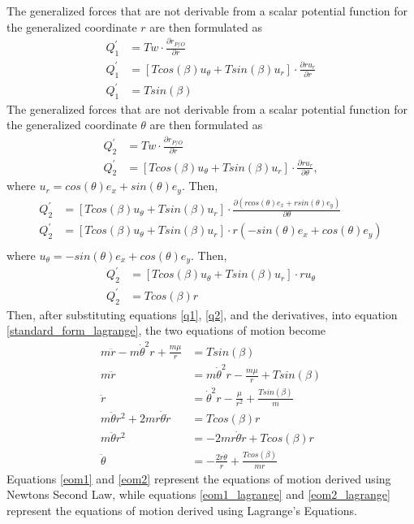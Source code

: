 \documentclass[]{article}
\begin{document}
The generalized forces that are not derivable from a scalar potential function for the generalized coordinate \(r\) are then formulated as
\begin{align}
	Q^{'}_{1} &= Tw \cdot  \frac{\partial r_{P/O}}{\partial r} \nonumber\\
	Q^{'}_{1} &= [Tcos(\beta)u_{\theta} + Tsin(\beta)u_{r}] \cdot \frac{\partial ru_{r}}{\partial r} \nonumber\\
	Q^{'}_{1} &= Tsin(\beta) \label{q1}
\end{align}
The generalized forces that are not derivable from a scalar potential function for the generalized coordinate \(\theta\) are then formulated as
\begin{align*}
	Q^{'}_{2} &= Tw \cdot  \frac{\partial r_{P/O}}{\partial r} \\
	Q^{'}_{2} &= [Tcos(\beta)u_{\theta} + Tsin(\beta)u_{r}] \cdot \frac{\partial ru_{r}}{\partial \theta},
\end{align*}
where \(u_r = cos(\theta)e_{x} + sin(\theta)e_{y}\). Then,
\begin{align*}
	Q^{'}_{2} &= [Tcos(\beta)u_{\theta} + Tsin(\beta)u_{r}] \cdot \frac{\partial (rcos(\theta)e_{x} + rsin(\theta)e_{y})}{\partial \theta} \\
	Q^{'}_{2} &= [Tcos(\beta)u_{\theta} + Tsin(\beta)u_{r}] \cdot r(-sin(\theta)e_{x} + cos(\theta)e_{y}) \\
\end{align*}
where \(u_{\theta} = -sin(\theta)e_{x} + cos(\theta)e_{y}\). Then,
\begin{align}
	Q^{'}_{2} &= [Tcos(\beta)u_{\theta} + Tsin(\beta)u_{r}] \cdot ru_{\theta} \nonumber\\
	Q^{'}_{2} &= Tcos(\beta)r \label{q2}
\end{align}
Then, after substituting equations \ref{q1}, \ref{q2}, and the derivatives, into equation \ref{standard_form_lagrange}, the two equations of motion become
\begin{align}
 m\ddot{r} - m\dot{\theta}^2r + \frac{m\mu}{r} &= Tsin(\beta) \nonumber\\
 m\ddot{r}                                     &= m\dot{\theta}^2r - \frac{m\mu}{r} + Tsin(\beta) \nonumber\\
 \ddot{r}                                      &= \dot{\theta}^2r - \frac{\mu}{r^2} + \frac{Tsin(\beta)}{m} \label{eom1_lagrange}\\
 m\ddot{\theta}r^2 + 2mr\dot{\theta}\dot{r}    &= Tcos(\beta)r \nonumber\\
 m\ddot{\theta}r^2                             &= -2mr\dot{\theta}\dot{r} + Tcos(\beta)r \nonumber\\
 \ddot{\theta}                                &= -\frac{2\dot{r}\dot{\theta}}{r}   + \frac{Tcos(\beta)}{mr} \label{eom2_lagrange}
\end{align}
Equations \ref{eom1} and \ref{eom2} represent the equations of motion derived using Newtons Second Law, while equations \ref{eom1_lagrange} and \ref{eom2_lagrange} represent the equations of motion derived using Lagrange's Equations. 
\end{document}
